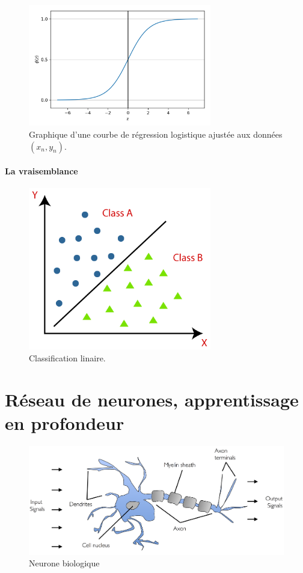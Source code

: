 		\begin{figure}[bth]%
			\centering
			\includegraphics[width=8cm]{images/reg_log_curve.png}
			\caption{Graphique d'une courbe de régression logistique ajustée aux données $(x_n , y_n)$. \cite[image de]{ml2008python}
			}
			\label{fig:reg_log_curve}
		\end{figure}
	
	\paragraph*{La vraisemblance} 
	
	\begin{figure}[bth]%
		\centering
		\includegraphics[width=8cm]{images/classification_linear.png}
		\caption{Classification linaire.}
		\label{fig:classification_linear}
	\end{figure}

	
		
	
	
\section{Réseau de neurones, apprentissage en profondeur}
	\lipsum[1]
	\begin{figure}[hth]%
		\centering
		\includegraphics[width=\textwidth]{images/neuron.png}
		\caption{Neurone biologique \cite[image de]{ml2008python}
		}
		\label{fig:bio_neuron}
	\end{figure}


